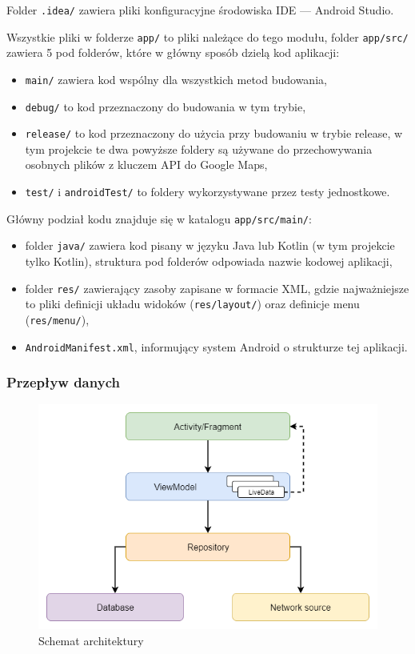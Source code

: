 \documentclass[polish,polish,a4paper,12pt]{article}
\begin{document}
		Folder \texttt{.idea/} zawiera pliki konfiguracyjne środowiska IDE — Android Studio.

		Wszystkie pliki w folderze \texttt{app/} to pliki należące do tego modułu, folder \texttt{app/src/} zawiera 5 pod folderów, które w główny sposób dzielą kod aplikacji:

		\begin{itemize}
			\item \texttt{main/} zawiera kod wspólny dla wszystkich metod budowania,
			\item \texttt{debug/} to kod przeznaczony do budowania w tym trybie,
			\item \texttt{release/} to kod przeznaczony do użycia przy budowaniu w trybie release, w tym projekcie te dwa powyższe foldery są używane do przechowywania osobnych plików z kluczem API do Google Maps,
			\item \texttt{test/} i \texttt{androidTest/} to foldery wykorzystywane przez testy jednostkowe.
		\end{itemize}

		Główny podział kodu znajduje się w katalogu \texttt{app/src/main/}:

		\begin{itemize}
			\item folder \texttt{java/} zawiera kod pisany w języku Java lub Kotlin (w tym projekcie tylko Kotlin), struktura pod folderów odpowiada nazwie kodowej aplikacji,
			\item folder \texttt{res/} zawierający zasoby zapisane w formacie XML, gdzie najważniejsze to pliki definicji układu widoków (\texttt{res/layout/}) oraz definicje menu (\texttt{res/menu/}),
			\item \texttt{AndroidManifest.xml}, informujący system Android o strukturze tej aplikacji.
		\end{itemize}

		\subsubsection{Przepływ danych}

		\begin{figure}[H]
			\centering
			\includegraphics[width = \textwidth]{architecture}
			\caption{Schemat architektury}
			\label{fig:architecture}
		\end{figure}
\end{document}
